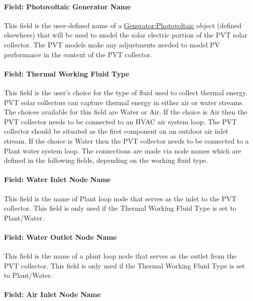 \paragraph{Field: Photovoltaic Generator Name}\label{field-photovoltaic-generator-name}

This field is the user-defined name of a \hyperref[generatorphotovoltaic-000]{Generator:Photovoltaic} object (defined elsewhere) that will be used to model the solar electric portion of the PVT solar collector. The PVT models make any adjustments needed to model PV performance in the context of the PVT collector.

\paragraph{Field: Thermal Working Fluid Type}\label{field-thermal-working-fluid-type}

This field is the user's choice for the type of fluid used to collect thermal energy. PVT solar collectors can capture thermal energy in either air or water streams. The choices available for this field are Water or Air. If the choice is Air then the PVT collector needs to be connected to an HVAC air system loop. The PVT collector should be situated as the first component on an outdoor air inlet stream. If the choice is Water then the PVT collector needs to be connected to a Plant water system loop. The connections are made via node names which are defined in the following fields, depending on the working fluid type.

\paragraph{Field: Water Inlet Node Name}\label{field-water-inlet-node-name-003}

This field is the name of Plant loop node that serves as the inlet to the PVT collector. This field is only used if the Thermal Working Fluid Type is set to Plant/Water.

\paragraph{Field: Water Outlet Node Name}\label{field-water-outlet-node-name-002}

This field is the name of a plant loop node that serves as the outlet from the PVT collector. This field is only used if the Thermal Working Fluid Type is set to Plant/Water.

\paragraph{Field: Air Inlet Node Name}\label{field-air-inlet-node-name-006}

